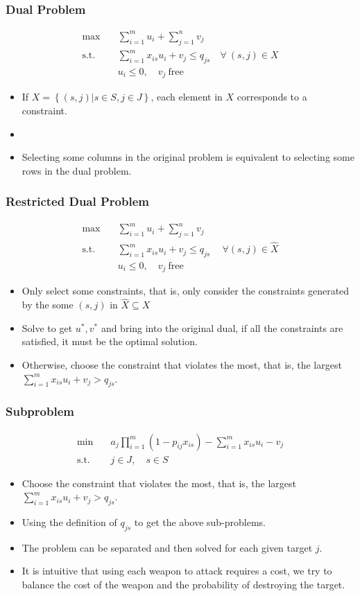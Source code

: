 \documentclass[CJK,10pt]{beamer}
\newcommand{\sumFromTo}[3]{\ensuremath{\sum_{#1}^{#2} #3}}
\newcommand{\optimalProblem}[3]
{\begin{align*}
    #1 \quad &#2 \\
    \mathrm{s. t.}\quad&#3
\end{align*}}
\begin{document}
\begin{frame}
    \frametitle{Dual Problem}
    
    \optimalProblem{\max}{\sumFromTo{i=1}{m}{u_i} + \sumFromTo{j=1}{n}{v_j}\tag{CG-Dual}}{\sumFromTo{i=1}{m}{x_{is}u_i}+ v_j \leq q_{js}\quad \forall ~(s,j) \in X\\ &u_i \leq 0,\quad v_j\ \mathrm{free}}
    \begin{itemize}
        \item If $X = \left\{(s,j) | s\in S , j \in J \right\}$, each element in $X$ corresponds to a constraint.
        \item \item Selecting some columns in the original problem is equivalent to selecting some rows in the dual problem.
    \end{itemize}
\end{frame}

\begin{frame}
    \frametitle{Restricted Dual Problem}
    
    \optimalProblem{\max}{\sumFromTo{i=1}{m}{u_i} + \sumFromTo{j=1}{n}{v_j}\tag{CG-Dual-R}}{\sumFromTo{i=1}{m}{x_{is}u_i}+ v_j \leq q_{js}\quad ~\forall (s,j) \in \hat{X} \\ &u_i \leq 0,\quad v_j\ \mathrm{free}}
    \begin{itemize}
        
        \item Only select some constraints, that is, only consider the constraints generated by the some $(s,j)$ in $\hat{X} \subseteq X$
        \item Solve to get $u^*, v^*$ and bring into the original dual, if all the constraints are satisfied, it must be the optimal solution.
        \item Otherwise, choose the constraint that violates the most, that is, the largest $\sumFromTo{i=1}{m}{x_{is}u_i}+ v_j > q_{js}$.
    \end{itemize}
\end{frame}

\begin{frame}
    \frametitle{Subproblem}
    \optimalProblem{\min}{a_j \prod_{i=1}^{m}{(1-p_{ij}x_{is})} -\sumFromTo{i=1}{m}{x_{is}}u_i - v_j}{j \in J,\quad s \in S\tag{CG-sub}}
    \begin{itemize}
        \item Choose the constraint that violates the most, that is, the largest $\sumFromTo{i=1}{m}{x_{is}u_i}+ v_j > q_{js}$.
        \item Using the definition of $q_{js}$ to get the above sub-problems.
        \item The problem can be separated and then solved for each given target $j$.
        \item It is intuitive that using each weapon to attack requires a cost, we try  to balance the cost of the weapon and the probability of destroying the target.
    \end{itemize}
\end{frame}
\end{document}
